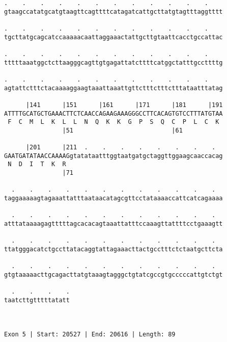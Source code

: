 \documentclass{article}
\begin{document}
\begin{Verbatim}
.    .    .    .    .    .    .    .    .    .    .    .    
gtaagccatatgcatgtaagttcagttttcatagatcattgcttatgtagtttaggtttt
                                                            
.    .    .    .    .    .    .    .    .    .    .    .    
tgcttatgcagcatccaaaaacaattaggaaactattgcttgtaattcacctgccattac
                                                            
.    .    .    .    .    .    .    .    .    .    .    .    
tttttaaatggctcttaagggcagttgtgagattatcttttcatggctatttgccttttg
                                                            
.    .    .    .    .    .    .    .    .    .    .    .    
agtattctttctacaaaaggaagtaaattaaattgttctttctttctttataatttatag
                                                            
      |141      |151      |161      |171      |181      |191
ATTTTGCATGCTGAAACTTCTCAACCAGAAGAAAGGGCCTTCACAGTGTCCTTTATGTAA
 F  C  M  L  K  L  L  N  Q  K  K  G  P  S  Q  C  P  L  C  K 
                |51                           |61           
  
      |201      |211  .    .    .    .    .    .    .    .  
GAATGATATAACCAAAAGgtatataatttggtaatgatgctaggttggaagcaaccacag
 N  D  I  T  K  R                                           
                |71                                         
  
  .    .    .    .    .    .    .    .    .    .    .    .  
taggaaaaagtagaaattatttaataacatagcgttcctataaaaccattcatcagaaaa
                                                            
  .    .    .    .    .    .    .    .    .    .    .    .  
atttataaaagagtttttagcacacagtaaattatttccaaagttattttcctgaaagtt
                                                            
  .    .    .    .    .    .    .    .    .    .    .    .  
ttatgggacatctgccttatacaggtattagaaacttactgcctttctctaatgcttcta
                                                            
  .    .    .    .    .    .    .    .    .    .    .    .  
gtgtaaaaacttgcagacttatgtaaagtagggctgtatcgccgtgcccccattgtctgt
                                                            
  .    .    .    .
taatcttgtttttatatt
                  
                  
 
Exon 5 | Start: 20527 | End: 20616 | Length: 89




\end{Verbatim}
\end{document}
